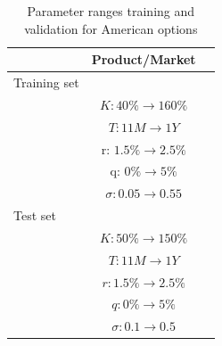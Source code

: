 \documentclass[12pt,a4paper,oneside]{book}
\begin{document}
\begin{table}\centering 
\begin{tabular}[t]{lcc}\toprule
            &   Product/Market   \\ \midrule
            Training set && \\\addlinespace
 & $K: 40 \% \rightarrow 160\%$  \\\addlinespace
			   & $T: 11M \rightarrow 1Y$            \\\addlinespace
			   & r: $1.5\% \rightarrow 2.5\%  $           \\\addlinespace
			   & q: $0 \%  \rightarrow 5 \%$          \\\addlinespace
			   &  $\sigma: 0.05 \rightarrow 0.55$         \\\addlinespace
			    Test set && \\\addlinespace
 & $K: 50 \% \rightarrow 150\%$ \\\addlinespace
			   & $T: 11M \rightarrow 1Y$         \\\addlinespace
			   & $r: 1.5\% \rightarrow 2.5\%  $      \\\addlinespace
			   & $q: 0 \%  \rightarrow 5 \%$       \\\addlinespace
			   &  $\sigma: 0.1 \rightarrow 0.5$        \\\bottomrule
\end{tabular}
\caption{Parameter ranges training and validation for American options }\label{table_American}
\end{table}
\end{document}
